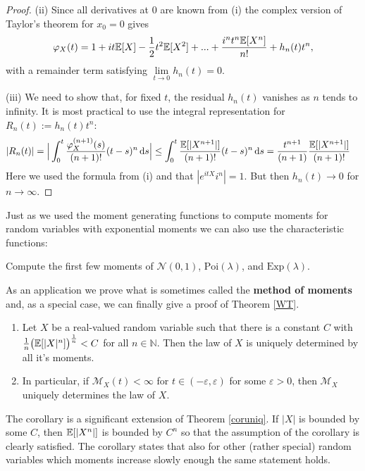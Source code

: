 \begin{proof}[Proof]
	(ii) Since all derivatives at $0$ are known from (i) the complex version of Taylor's theorem for $x_0 =0$ gives
			\begin{align*}
				\varphi_X(t) = 1+  i t \mathbb{E}[X] - \frac{1}{2} t^2 \mathbb{E} [ X^2] + ... + \frac{i^n t^n\mathbb{E} [X^n]}{n!} + h_n(t)t^n,
			\end{align*}
			with a remainder term satisfying $\lim\limits_{t\to 0} h_n(t) = 0$.\smallskip

	(iii) 
			We need to show that, for fixed $t$, the residual $h_n(t)$ vanishes as $n$ tends to infinity. It is most practical to use the integral representation for $R_n(t):=h_n(t)t^n$:
			\begin{align*}
				\lvert R_n(t) \rvert = \Big\lvert \int_0^t \frac{\varphi_X^{(n+1)}(s)}{(n+1)!}(t-s)^n \, \mathrm{d} s \Big\rvert &\leq \int_0^t \frac{\mathbb{E} [ \lvert X^{n+1}\rvert] }{(n+1)!}(t-s)^n \, \mathrm{d} s
				 = \frac{t^{n+1}}{(n+1)} \frac{\mathbb{E}[ \lvert X^{n+1}\rvert ]}{(n+1)!}
			\end{align*}
			Here we used the formula from (i) and that $|e^{itX}i^n|=1$. But then $h_n(t)\to 0$ for $n\to\infty$.
\end{proof}
Just as we used the moment generating functions to compute moments for random variables with exponential moments we can also use the characteristic functions:
\begin{luebung}
	Compute the first few moments of $\mathcal N(0,1)$, $\text{Poi}(\lambda)$, and $\text{Exp}(\lambda)$.
\end{luebung}
As an application we prove what is sometimes called the \textbf{method of moments} and, as a special case, we can finally give a proof of Theorem \ref{WT}.
\begin{llemma}
\begin{corollary}\label{cor:uniqu}
	\begin{enumerate}[label=(\roman*)]
		\item
			Let $X$ be a real-valued random variable such that there is a constant $C$ with $\frac{1}{n} \big( \mathbb{E}[|X|^n ] \big)^{\frac{1}{n}}< C$ for all $n\in \mathbb{N}$. Then the law of $X$ is uniquely determined by all it's moments.
		\item
			In particular, if $\mathcal M_X(t) < \infty$ for $t \in (-\varepsilon,\varepsilon)$ for some $\varepsilon > 0$, then $\mathcal M_X$ uniquely determines the law of $X$.
	\end{enumerate}
\end{corollary}
\end{llemma}
The corollary is a significant extension of Theorem \ref{coruniq}. If $|X|$ is bounded by some $C$, then $\mathbb{E}[|X^n|]$ is bounded by $C^n$ so that the assumption of the corollary is clearly satisfied. The corollary states that also for other (rather special) random variables which moments increase slowly enough the same statement holds.
